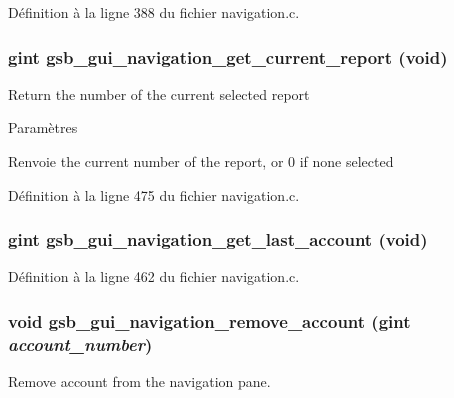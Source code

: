 Définition à la ligne 388 du fichier navigation.c.

\subsubsection[{gsb\_\-gui\_\-navigation\_\-get\_\-current\_\-report}]{\setlength{\rightskip}{0pt plus 5cm}gint gsb\_\-gui\_\-navigation\_\-get\_\-current\_\-report (void)}\label{navigation_8c_aef700722a199569003341a41144ee004}
Return the number of the current selected report


\begin{DoxyParams}{Paramètres}
\item[{\em }]\end{DoxyParams}
\begin{DoxyReturn}{Renvoie}
the current number of the report, or 0 if none selected 
\end{DoxyReturn}


Définition à la ligne 475 du fichier navigation.c.

\subsubsection[{gsb\_\-gui\_\-navigation\_\-get\_\-last\_\-account}]{\setlength{\rightskip}{0pt plus 5cm}gint gsb\_\-gui\_\-navigation\_\-get\_\-last\_\-account (void)}\label{navigation_8c_ad804dac7f03dd7f66ba7e0d43aa84165}


Définition à la ligne 462 du fichier navigation.c.

\subsubsection[{gsb\_\-gui\_\-navigation\_\-remove\_\-account}]{\setlength{\rightskip}{0pt plus 5cm}void gsb\_\-gui\_\-navigation\_\-remove\_\-account (gint {\em account\_\-number})}\label{navigation_8c_a6e9f014d077329a589843dbe3edd15de}
Remove account from the navigation pane.


